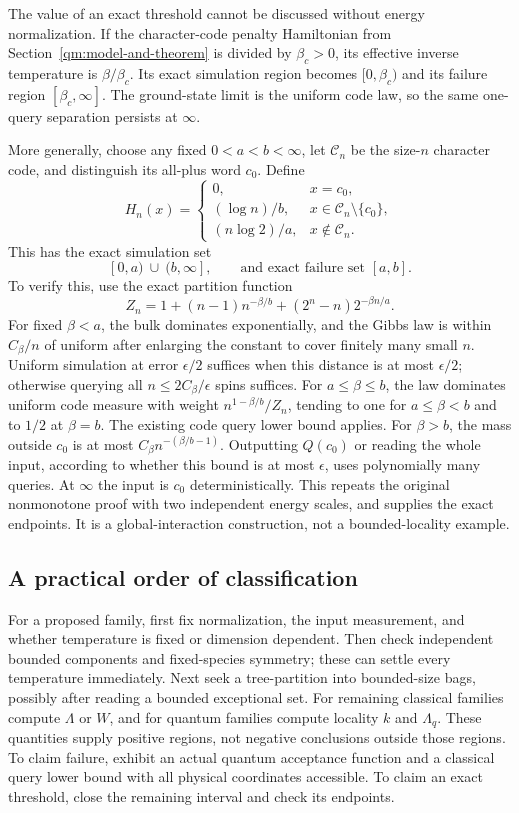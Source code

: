 The value of an exact threshold cannot be discussed without energy
normalization. If the character-code penalty Hamiltonian from
Section~\ref{qm:model-and-theorem} is divided by $\beta_c>0$,
its effective inverse temperature is $\beta/\beta_c$. Its exact
simulation region becomes $[0,\beta_c)$ and its failure region
$[\beta_c,\infty]$. The ground-state limit is the uniform code law,
so the same one-query separation persists at $\infty$.

More generally, choose any fixed $0<a<b<\infty$, let $\mathcal C_n$
be the size-$n$ character code, and distinguish its all-plus word
$c_0$. Define
\[
 H_n(x)=\begin{cases}
 0,&x=c_0,\\
 (\log n)/b,&x\in\mathcal C_n\setminus\{c_0\},\\
 (n\log2)/a,&x\notin\mathcal C_n.
 \end{cases}
 \tag{CW1}
\]
This has the exact simulation set
\[
 \boxed{[0,a)\ \cup\ (b,\infty]},\qquad
 \text{and exact failure set }[a,b].
 \tag{CW2}
\]
To verify this, use the exact partition function
\[
 Z_n=1+(n-1)n^{-\beta/b}+(2^n-n)2^{-\beta n/a}.
\]
For fixed $\beta<a$, the bulk dominates exponentially, and the
Gibbs law is within $C_\beta/n$ of uniform after enlarging the
constant to cover finitely many small $n$. Uniform simulation at
error $\epsilon/2$ suffices when this distance is at most
$\epsilon/2$; otherwise querying all $n\le2C_\beta/\epsilon$
spins suffices. For $a\le\beta\le b$, the law dominates uniform
code measure with weight
$n^{1-\beta/b}/Z_n$, tending to one for $a\le\beta<b$ and
to $1/2$ at $\beta=b$. The existing code query lower bound applies.
For $\beta>b$, the mass outside $c_0$ is at most
$C_\beta n^{-(\beta/b-1)}$. Outputting $Q(c_0)$ or reading the
whole input, according to whether this bound is at most $\epsilon$,
uses polynomially many queries. At $\infty$ the input is $c_0$
deterministically. This repeats the original nonmonotone proof with
two independent energy scales, and supplies the exact endpoints.
It is a global-interaction construction, not a bounded-locality example.

\subsection{A practical order of classification}

For a proposed family, first fix normalization, the input measurement,
and whether temperature is fixed or dimension dependent. Then check
independent bounded components and fixed-species symmetry; these can
settle every temperature immediately. Next seek a tree-partition
into bounded-size bags, possibly after reading a bounded exceptional
set. For remaining classical families compute $\Lambda$ or $W$,
and for quantum families compute locality $k$ and $\Lambda_q$.
These quantities supply positive regions, not negative conclusions
outside those regions. To claim failure, exhibit an actual quantum
acceptance function and a classical query lower bound with all
physical coordinates accessible. To claim an exact threshold, close
the remaining interval and check its endpoints.

